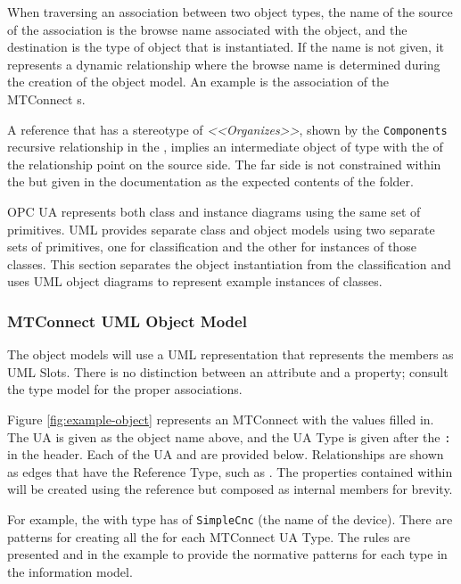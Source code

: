 When traversing an association between two object types, the name of the source of the association is the browse name associated with the object, and the destination is the type of object that is instantiated. If the name is not given, it represents a dynamic relationship where the browse name is determined during the creation of the object model. An example is the association of the MTConnect s.

A reference that has a stereotype of \textit{<<Organizes>>}, shown by the \texttt{Components} recursive relationship in the , implies an intermediate object of type  with the  of the relationship point on the source side. The far side is not constrained within the  but given in the documentation as the expected contents of the folder.

OPC UA represents both class and instance diagrams using the same set of primitives. UML provides separate class and object models using two separate sets of primitives, one for classification and the other for instances of those classes. This section separates the object instantiation from the classification and uses UML object diagrams to represent example instances of classes.

\FloatBarrier

\subsubsection{MTConnect UML Object Model}

The object models will use a UML representation that represents the members as UML Slots. There is no distinction between an attribute and a property; consult the type model for the proper associations.



Figure \ref{fig:example-object} represents an MTConnect  with the values filled in. The UA  is given as the object name above, and the UA Type is given after the \texttt{:} in the header. Each of the UA  and  are provided below. Relationships are shown as edges that have the Reference Type, such as . The properties contained within will be created using the  reference but composed as internal members for brevity.

For example, the with type  has  of \texttt{SimpleCnc} (the name of the device). There are patterns for creating all the  for each MTConnect UA Type. The rules are presented and in the example to provide the normative patterns for each type in the information model.

